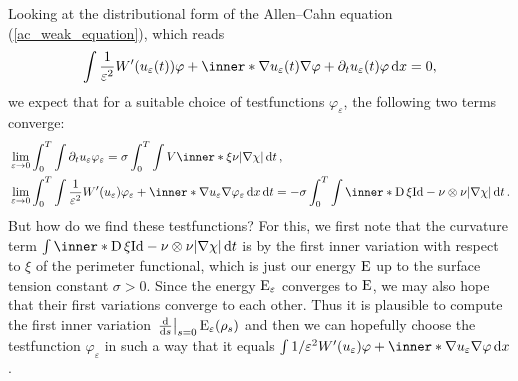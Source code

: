 Looking at the distributional form of the Allen--Cahn equation 
(\ref{ac_weak_equation}), which reads
\begin{equation*}
	\int
	\frac{ 1 }{ \varepsilon^{ 2 } } W' ( u_{ \varepsilon} ( t ) ) \varphi
	+
	\inner*{ \nabla u_{ \varepsilon } ( t ) }{\nabla \varphi }
	+
	\partial_{ t } u_{ \varepsilon} ( t ) \varphi 
	\dd{x}
	=
	0,
\end{equation*}
we expect that for a suitable choice of testfunctions $ \varphi_{ \varepsilon } 
$, the following two terms converge:
\begin{align*}
	& \lim_{ \varepsilon \to 0 }
	\int_{ 0 }^{ T }
	\int 
	\partial_{ t } u_{ \varepsilon } \varphi_{ \varepsilon }
	=
	\sigma
	\int_{ 0 }^{ T }
	\int
	V \inner*{ \xi }{ \nu }
	\abs{ \nabla \chi }
	\dd{ t },
	\\
	& \lim_{ \varepsilon \to 0 }
	\int_{ 0 }^{ T }
	\int
	\frac{1 }{ \varepsilon^{ 2 } }
	W'( u_{ \varepsilon } )
	\varphi_{ \varepsilon}
	+ 
	\inner*{ \nabla u_{ \varepsilon } }{ \nabla \varphi_{ \varepsilon } }
	\dd{ x }
	\dd{ t }
	=
	- 
	\sigma \int_{ 0 }^{ T }
	\int
	\inner*{ \diff \xi }{ \mathrm{Id} - \nu \otimes \nu }
	\abs{ \nabla \chi }
	\dd{ t }.
\end{align*}
But how do we find these testfunctions? For this, we first note that the 
curvature term
$ \int \inner*{ \diff \xi }{ \mathrm{Id} - \nu \otimes \nu } \abs{ \nabla \chi 
} \dd{ t } $ is by \cite[Thm.~17.5]{maggi_sets_of_finite_perimeter} the first 
inner variation with respect to $ \xi $ of the perimeter functional, which is 
just our energy $ \operatorname{E} $ up to the surface tension constant $ \sigma > 0 $. 
Since the energy $ \operatorname{E}_{ \varepsilon } $ converges to $ \operatorname{E} $, we may 
also hope that their first variations converge to each other. Thus it is 
plausible to compute the first inner variation 
$ \left.\dv{ s } \right|_{ s = 0 } \operatorname{E}_{ \varepsilon } ( \rho_{ s } ) $ and 
then we can hopefully choose the testfunction $ \varphi_{ \varepsilon } $ in 
such a way that it equals
$ 
\int
1 / \varepsilon^{ 2 }  W' ( u_{ \varepsilon} ) \varphi
+
\inner*{ \nabla u_{ \varepsilon } }{ \nabla \varphi }
\dd{x}
$.


